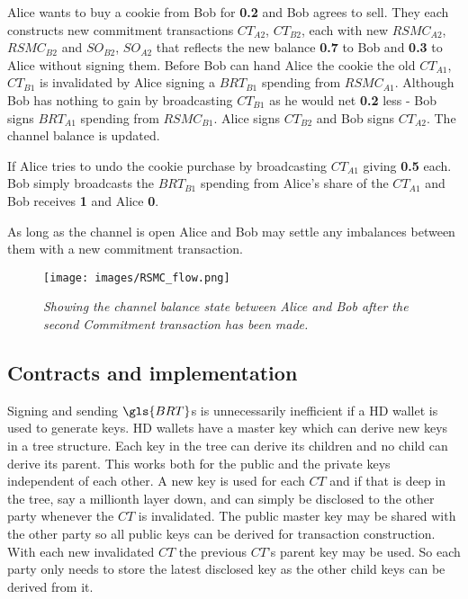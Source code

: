 Alice wants to buy a cookie from Bob for \textbf{0.2\bitcoin} and Bob agrees to sell. They each constructs new \gls{commitment transaction}s $CT_{A2}$, $CT_{B2}$, each with new $RSMC_{A2}$, $RSMC_{B2}$ and $SO_{B2}$, $SO_{A2}$ that reflects the new balance \textbf{0.7\bitcoin} to Bob and \textbf{0.3\bitcoin} to Alice without signing them. Before Bob can hand Alice the cookie the old $CT_{A1}$, $CT_{B1}$ is invalidated by Alice signing a $BRT_{B1}$ spending from $RSMC_{A1}$. Although Bob has nothing to gain by broadcasting $CT_{B1}$ as he would net \textbf{0.2\bitcoin} less - Bob signs $BRT_{A1}$ spending from $RSMC_{B1}$. Alice signs $CT_{B2}$ and Bob signs $CT_{A2}$. The channel balance is updated.

If Alice tries to undo the cookie purchase by broadcasting $CT_{A1}$ giving \textbf{0.5\bitcoin} each. Bob simply broadcasts the $BRT_{B1}$ spending from Alice's share of the $CT_{A1}$ and Bob receives \textbf{1\bitcoin} and Alice \textbf{0\bitcoin}. 

As long as the channel is open Alice and Bob may settle any imbalances between them with a new commitment transaction. 

\begin{figure}[!htb]
		\hspace*{-1.2cm} 
	\centering
	\texttt{[image: images/RSMC\_flow.png]}
	\caption{\textit{Showing the channel balance state between Alice and Bob after the second Commitment transaction has been made. 
	}}
	\label{fig:rsmc_second_commitment}
		\hspace*{2mm} 
\end{figure}

\subsection{Contracts and implementation}
\label{sec:hdw}
Signing and sending $\gls{BRT}$s is unnecessarily inefficient if a HD wallet is used to generate keys\cite{bip:0032:hd:wallet}. HD wallets have a master key which can derive new keys in a tree structure. Each key in the tree can derive its children and no child can derive its parent. This works both for the public and the private keys independent of each other. A new key is used for each $CT$ and if that is deep in the tree, say a millionth layer down, and can simply be disclosed to the other party whenever the $CT$ is invalidated. The public master key may be shared with the other party so all public keys can be derived for transaction construction. With each new invalidated $CT$ the previous $CT$'s parent key may be used. So each party only needs to store the latest disclosed key as the other child keys can be derived from it.

